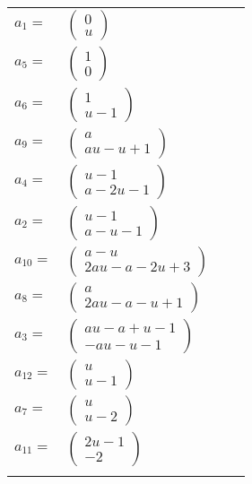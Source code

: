 \documentclass[1p]{elsarticle_modified}
\theoremstyle{definition}
\begin{document}
\begin{tabular}{m{7pt} m{180pt} m{7pt} m{180pt} }
\flushright $a_{1}=$&$\begin{pmatrix}0\\u\end{pmatrix}$ \\
\flushright $a_{5}=$&$\begin{pmatrix}1\\0\end{pmatrix}$ \\
\flushright $a_{6}=$&$\begin{pmatrix}1\\u-1\end{pmatrix}$ \\
\flushright $a_{9}=$&$\begin{pmatrix}a\\a u- u+1\end{pmatrix}$ \\
\flushright $a_{4}=$&$\begin{pmatrix}u-1\\a-2 u-1\end{pmatrix}$ \\
\flushright $a_{2}=$&$\begin{pmatrix}u-1\\a- u-1\end{pmatrix}$ \\
\flushright $a_{10}=$&$\begin{pmatrix}a- u\\2 a u- a-2 u+3\end{pmatrix}$ \\
\flushright $a_{8}=$&$\begin{pmatrix}a\\2 a u- a- u+1\end{pmatrix}$ \\
\flushright $a_{3}=$&$\begin{pmatrix}a u- a+u-1\\- a u- u-1\end{pmatrix}$ \\
\flushright $a_{12}=$&$\begin{pmatrix}u\\u-1\end{pmatrix}$ \\
\flushright $a_{7}=$&$\begin{pmatrix}u\\u-2\end{pmatrix}$ \\
\flushright $a_{11}=$&$\begin{pmatrix}2 u-1\\-2\end{pmatrix}$\\&\end{tabular}
\end{document}
